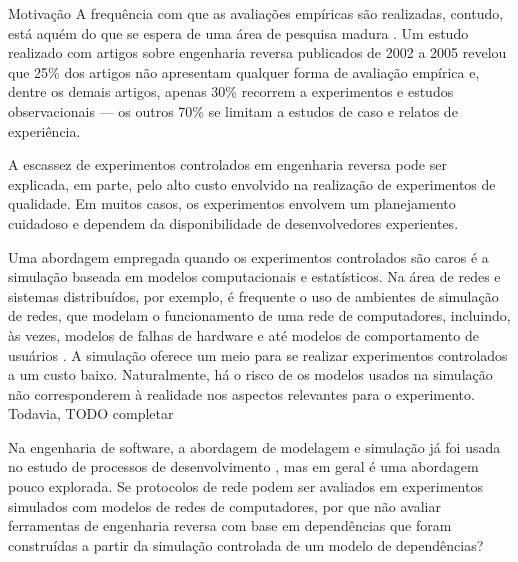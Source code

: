 \begin{section}{Motivação}
	 A frequência com que as avaliações empíricas são realizadas, contudo, está aquém do que se espera de uma área de pesquisa madura \cite{Tonella2007}. Um estudo realizado com artigos sobre engenharia reversa publicados de 2002 a 2005 revelou que 25\% dos artigos não apresentam qualquer forma de avaliação empírica e, dentre os demais artigos, apenas 30\% recorrem a experimentos e estudos observacionais --- os outros 70\% se limitam a estudos de caso e relatos de experiência.

		A escassez de experimentos controlados em engenharia reversa pode ser explicada, em parte, pelo alto custo envolvido na realização de experimentos de qualidade. Em muitos casos, os experimentos envolvem um planejamento cuidadoso e dependem da disponibilidade de desenvolvedores experientes.

		Uma abordagem empregada quando os experimentos controlados são caros é a simulação baseada em modelos computacionais e estatísticos. Na área de redes e sistemas distribuídos, por exemplo, é frequente o uso de ambientes de simulação de redes, que modelam o funcionamento de uma rede de computadores, incluindo, às vezes, modelos de falhas de hardware e até modelos de comportamento de usuários \cite{White2002}. A simulação oferece um meio para se realizar experimentos controlados a um custo baixo. Naturalmente, há o risco de os modelos usados na simulação não corresponderem à realidade nos aspectos relevantes para o experimento. Todavia, TODO completar

		Na engenharia de software, a abordagem de modelagem e simulação já foi usada no estudo de processos de desenvolvimento \cite{Stopford2008}, mas em geral é uma abordagem pouco explorada. Se protocolos de rede podem ser avaliados em experimentos simulados com modelos de redes de computadores, por que não avaliar ferramentas de engenharia reversa com base em dependências que foram construídas a partir da simulação controlada de um modelo de dependências?
		
\end{section}

